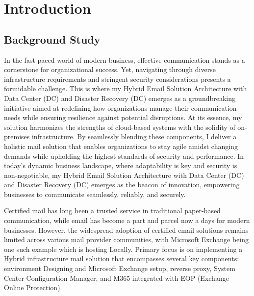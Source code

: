 

\chapter{Introduction}

\section{Background Study}
In the fast-paced world of modern business, effective communication stands as a cornerstone for organizational success. Yet, navigating through diverse infrastructure requirements and stringent security considerations presents a formidable challenge. This is where my Hybrid Email Solution Architecture with Data Center (DC) and Disaster Recovery (DC) emerges as a groundbreaking initiative aimed at redefining how organizations manage their communication needs while ensuring resilience against potential disruptions. At its essence, my solution harmonizes the strengths of cloud-based systems with the solidity of on-premises infrastructure. By seamlessly blending these components, I deliver a holistic mail solution that enables organizations to stay agile amidst changing demands while upholding the highest standards of security and performance.
In today's dynamic business landscape, where adaptability is key and security is non-negotiable, my Hybrid Email Solution Architecture with Data Center (DC) and Disaster Recovery (DC) emerges as the beacon of innovation, empowering businesses to communicate seamlessly, reliably, and securely.

Certified mail has long been a trusted service in traditional paper-based communication, while email has become a part and parcel now a days for modern businesses. However, the widespread adoption of certified email solutions remains limited across various mail provider communities, with Microsoft Exchange being one such example which is hosting Locally. Primary focus is on implementing a Hybrid infrastructure mail solution that encompasses several key components: environment Designing and Microsoft Exchange setup, reverse proxy, System Center Configuration Manager, and M365 integrated with EOP (Exchange Online Protection).


